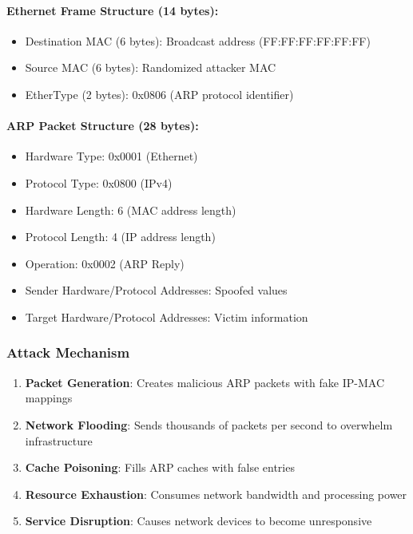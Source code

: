 \documentclass[12pt,a4paper]{article}
\begin{document}
\paragraph{Ethernet Frame Structure (14 bytes):}
\begin{itemize}
    \item Destination MAC (6 bytes): Broadcast address (FF:FF:FF:FF:FF:FF)
    \item Source MAC (6 bytes): Randomized attacker MAC
    \item EtherType (2 bytes): 0x0806 (ARP protocol identifier)
\end{itemize}

\paragraph{ARP Packet Structure (28 bytes):}
\begin{itemize}
    \item Hardware Type: 0x0001 (Ethernet)
    \item Protocol Type: 0x0800 (IPv4)
    \item Hardware Length: 6 (MAC address length)
    \item Protocol Length: 4 (IP address length)
    \item Operation: 0x0002 (ARP Reply)
    \item Sender Hardware/Protocol Addresses: Spoofed values
    \item Target Hardware/Protocol Addresses: Victim information
\end{itemize}

\subsubsection{Attack Mechanism}
\begin{enumerate}
    \item \textbf{Packet Generation}: Creates malicious ARP packets with fake IP-MAC mappings
    \item \textbf{Network Flooding}: Sends thousands of packets per second to overwhelm infrastructure
    \item \textbf{Cache Poisoning}: Fills ARP caches with false entries
    \item \textbf{Resource Exhaustion}: Consumes network bandwidth and processing power
    \item \textbf{Service Disruption}: Causes network devices to become unresponsive
\end{enumerate}
\end{document}

